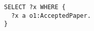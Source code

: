 \begin{minipage}{0.5\linewidth}
\begin{lstlisting}
SELECT ?x WHERE {
  ?x a o1:AcceptedPaper.
}
\end{lstlisting}
\end{minipage}
